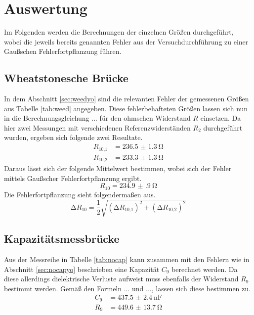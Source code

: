 \section{Auswertung}
Im Folgenden werden die Berechnungen der einzelnen Größen durchgeführt, wobei die jeweils bereits genannten Fehler aus der Versuchdurchführung zu einer
Gaußschen Fehlerfortpflanzung führen. 

\subsection{Wheatstonesche Brücke}
In dem Abschnitt \ref{sec:weedyo} sind die relevanten Fehler der gemessenen Größen aus Tabelle \ref{tab:weed} angegeben. Diese fehlerbehafteten Größen lassen sich nun in die Berechnungsgleichung ...
für den ohmschen Widerstand $R$ einsetzen.
Da hier zwei Messungen mit verschiedenen Referenzwiderständen $R_{2}$ durchgeführt wurden, ergeben sich folgende zwei Resultate.
\begin{align}
R_{10\text{,}1} &= \SI{236.5(13)}{\ohm} \\
R_{10\text{,}2} &= \SI{233.3(13)}{\ohm} 
\end{align}
Daraus lässt sich der folgende Mittelwert bestimmen, wobei sich der Fehler mittels Gaußscher Fehlerfortpflanzung ergibt.
\begin{equation}
R_{10} = \SI{234.9(9)}{\ohm}
\end{equation}
Die Fehlerfortpflanzung sieht folgendermaßen aus.
\begin{equation}
\increment R_{10} = \frac{1}{2} \sqrt{(\increment R_{10\text{,}1})^{2} + (\increment R_{10\text{,}2})^{2} }
\end{equation}

\subsection{Kapazitätsmessbrücke}
Aus der Messreihe in Tabelle \ref{tab:nocap} kann zusammen mit den Fehlern wie in Abschnitt \ref{sec:nocapyo} beschrieben eine Kapazität $C_{9}$ berechnet werden. Da diese allerdings dielektrische Verluste 
aufweist muss ebenfalls der Widerstand $R_{9}$ bestimmt werden. Gemäß den Formeln ... und ..., lassen sich diese bestimmen zu.
\begin{align}
C_{9} &= \SI{437.5(24)}{\nano\farad} \\
R_{9} &= \SI{449.6(137)}{\ohm} 
\end{align}


